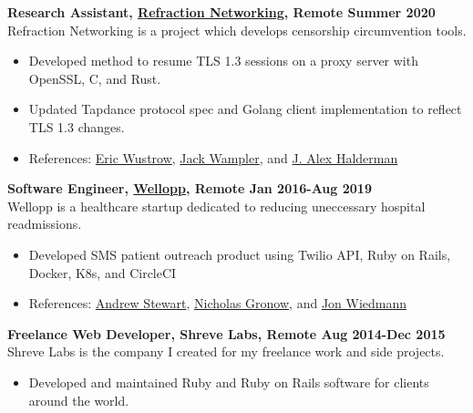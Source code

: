 \documentclass[10pt]{article}
\newcommand{\itempad}{\vspace{0.1in}}
\begin{document}
  \itempad

  \textbf{Research Assistant, \href{https://refraction.network/}{Refraction Networking}, Remote \hfill Summer 2020}\\
  Refraction Networking is a project which develops censorship circumvention tools.
  \vspace{-0.07in}
  \begin{itemize}[leftmargin=1em]
    \setlength\itemsep{-0.3em}
    \item Developed method to resume TLS 1.3 sessions on a proxy server with OpenSSL, C, and Rust.
    \item Updated Tapdance protocol spec and Golang client implementation to reflect TLS 1.3 changes.
    \item References: \href{https://ericw.us/trow/}{Eric Wustrow}, \href{https://www.linkedin.com/in/jack-wampler-24a65190/}{Jack Wampler}, and \href{https://jhalderm.com/}{J. Alex Halderman}
  \end{itemize}

  \itempad

  \textbf{Software Engineer, \href{https://wellopp.com/}{Wellopp}, Remote \hfill Jan 2016-Aug 2019}\\
  Wellopp is a healthcare startup dedicated to reducing uneccessary hospital readmissions.
  \vspace{-0.07in}
  \begin{itemize}[leftmargin=1em]
    \setlength\itemsep{-0.3em}
    \item Developed SMS patient outreach product using Twilio API, Ruby on Rails, Docker, K8s, and CircleCI
    \item References:
      \href{https://www.linkedin.com/in/andrew-stewart-95772914b/}{Andrew Stewart},
      \href{https://www.linkedin.com/in/nicholasgronow/}{Nicholas Gronow},
      and \href{https://www.linkedin.com/in/jon-wiedmann-b6442b67/}{Jon Wiedmann}
  \end{itemize}

  \itempad

  \textbf{Freelance Web Developer, Shreve Labs, Remote \hfill Aug 2014-Dec 2015}\\
  Shreve Labs is the company I created for my freelance work and side projects.
  \vspace{-0.07in}
  \begin{itemize}[leftmargin=1em]
    \setlength\itemsep{-0.3em}
    \item Developed and maintained Ruby and Ruby on Rails software for clients around the world.
  \end{itemize}
\end{document}
